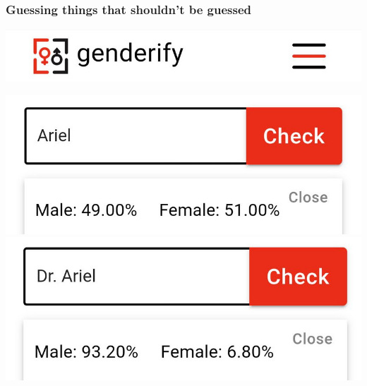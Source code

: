 \documentclass[aspectratio=169,xcolor=dvipsnames]{beamer}
\begin{document}
\begin{frame}
\frametitle{Guessing things that shouldn't be guessed}
\begin{center}
\includegraphics[height=0.175\paperheight,keepaspectratio]{images/genderify_header} 
\bigskip

\includegraphics[height=0.275\paperheight,keepaspectratio]{images/genderify_ariel}
\includegraphics[height=0.275\paperheight,keepaspectratio]{images/genderify_dr_ariel} 
\end{center}
\end{frame}
\end{document}
